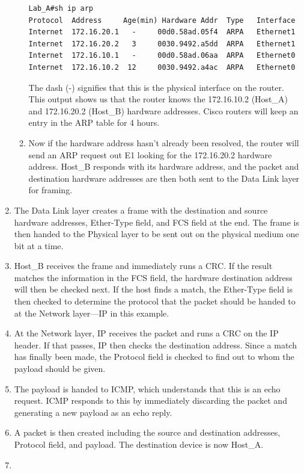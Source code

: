 \begin{enumerate}
\begin{enumerate}
\begin{verbatim}
Lab_A#sh ip arp
Protocol  Address     Age(min) Hardware Addr  Type   Interface
Internet  172.16.20.1   -     00d0.58ad.05f4  ARPA   Ethernet1
Internet  172.16.20.2   3     0030.9492.a5dd  ARPA   Ethernet1
Internet  172.16.10.1   -     00d0.58ad.06aa  ARPA   Ethernet0
Internet  172.16.10.2  12     0030.9492.a4ac  ARPA   Ethernet0
\end{verbatim}

    The dash (-) signifies that this is the physical interface on the
    router. This output shows us that the router knows the 172.16.10.2
    (Host\_A) and 172.16.20.2 (Host\_B) hardware addresses. Cisco
    routers will keep an entry in the ARP table for 4 hours.
  \item
    Now if the hardware address hasn't already been resolved, the router
    will send an ARP request out E1 looking for the 172.16.20.2 hardware
    address. Host\_B responds with its hardware address, and the packet
    and destination hardware addresses are then both sent to the Data
    Link layer for framing.
  \end{enumerate}
\item
  The Data Link layer creates a frame with the destination and source
  hardware addresses, Ether-Type field, and FCS field at the end. The
  frame is then handed to the Physical layer to be sent out on the
  physical medium one bit at a time.
\item
  Host\_B receives the frame and immediately runs a CRC. If the result
  matches the information in the FCS field, the hardware destination
  address will then be checked next. If the host finds a match, the
  Ether-Type field is then checked to determine the protocol that the
  packet should be handed to at the Network layer---IP in this example.
\item
  At the Network layer, IP receives the packet and runs a CRC on the IP
  header. If that passes, IP then checks the destination address. Since
  a match has finally been made, the Protocol field is checked to find
  out to whom the payload should be given.
\item
  The payload is handed to ICMP, which understands that this is an echo
  request. ICMP responds to this by immediately discarding the packet
  and generating a new payload as an echo reply.
\item
  A packet is then created including the source and destination
  addresses, Protocol field, and payload. The destination device is now
  Host\_A.
\item

\end{enumerate}
